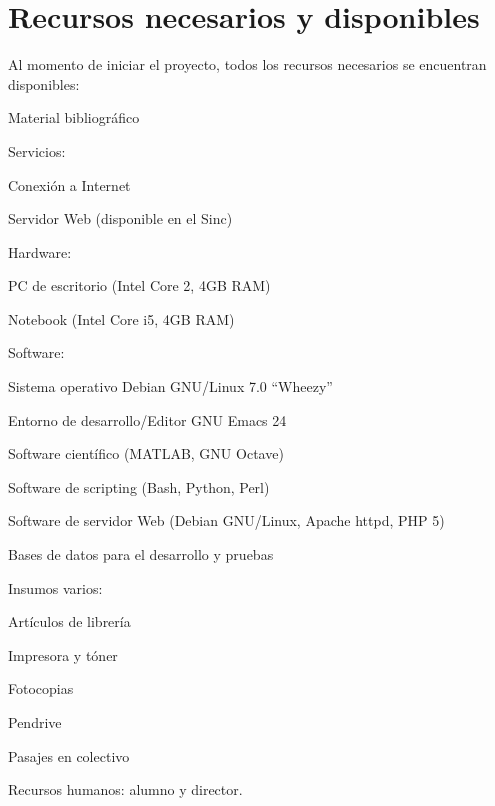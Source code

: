 \documentclass[12pt,bibliography=oldstyle,DIV=12,parskip=full-,titlepage]{scrartcl}
\begin{document}
\section{Recursos necesarios y disponibles}
Al momento de iniciar el proyecto, todos los recursos necesarios se
encuentran disponibles:
\begin{itemize*}
\item Material bibliográfico
\item Servicios:
  \begin{itemize*}
  \item Conexión a Internet
  \item Servidor Web (disponible en el Sinc)
  \end{itemize*}
\item Hardware:
  \begin{itemize*}
  \item PC de escritorio (Intel Core 2, 4GB RAM)
  \item Notebook (Intel Core i5, 4GB RAM)
  \end{itemize*}
\item Software:
  \begin{itemize*}
  \item Sistema operativo Debian GNU/Linux 7.0 ``Wheezy''
  \item Entorno de desarrollo/Editor GNU Emacs 24
  \item Software científico (MATLAB, GNU Octave)
  \item Software de scripting (Bash, Python, Perl)
  \item Software de servidor Web (Debian GNU/Linux, Apache
    httpd, PHP 5)
  \end{itemize*}
\item Bases de datos para el desarrollo y pruebas
\item Insumos varios:
  \begin{itemize*}
  \item Artículos de librería
  \item Impresora y tóner
  \item Fotocopias
  \item Pendrive
  \item Pasajes en colectivo
  \end{itemize*}
\item Recursos humanos: alumno y director.
\end{itemize*}
%
%
\newpage
\end{document}
